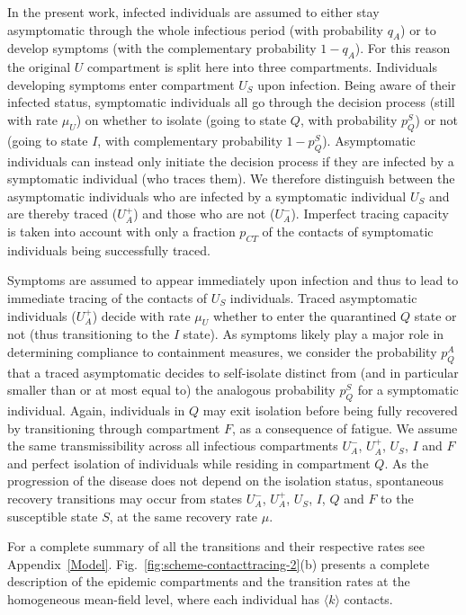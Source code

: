 \documentclass[aps,twocolumn,superscriptaddress,nofootinbib,pre,floatfix]{revtex4-1}
\begin{document}
In the present work, infected individuals are assumed to either stay
asymptomatic through the whole infectious period (with probability
$q_A$) or to develop symptoms (with the complementary probability $1-q_A$).
For this reason the original $U$ compartment is split here into three
compartments.
Individuals developing symptoms enter compartment $U_S$ upon infection.
Being aware of their infected status, symptomatic individuals all go
through the decision process (still with rate $\mu_U$)
on whether to isolate (going to state $Q$, with probability $p_Q^S$)
or not (going to state $I$, with complementary probability $1-p_Q^S$).
Asymptomatic individuals can instead only initiate the decision
process if they are infected by a symptomatic individual (who traces them).
We therefore distinguish
between the asymptomatic individuals who are infected by a
symptomatic individual $U_S$ and are thereby traced ($U_A^+$)
and those who are not ($U_A^-$).
Imperfect tracing capacity is taken into account with
only a fraction $p_{CT}$ of the contacts of symptomatic individuals being successfully traced.


Symptoms are assumed to appear immediately upon infection and thus to
lead to immediate tracing of the contacts of $U_S$ individuals.
Traced asymptomatic individuals ($U_A^+$) decide with rate $\mu_U$
whether to enter the quarantined $Q$ state or not
(thus transitioning to the $I$ state).
As symptoms likely play a major role in determining compliance to
containment measures, we consider the probability
$p_Q^A$ that a traced asymptomatic decides to self-isolate distinct
from (and in particular smaller than or at most equal to) the analogous
probability $p_Q^S$ for a symptomatic individual.
Again, individuals in $Q$ may exit isolation before being fully
recovered by transitioning through compartment $F$, as a consequence
of fatigue.
We assume the same transmissibility across all infectious compartments
$U_A^-$, $U_A^+$, $U_S$, $I$ and $F$ and perfect isolation of
individuals while residing in compartment $Q$.
As the progression of the disease does not depend on the isolation
status, spontaneous recovery transitions may occur from states $U_A^-$,
$U_A^+$, $U_S$, $I$, $Q$ and $F$ to the susceptible state $S$, at the same
recovery rate $\mu$.

For a complete summary of all the transitions and their respective rates
see Appendix~\ref{Model}.
Fig.~\ref{fig:scheme-contacttracing-2}(b) presents a complete
description of the epidemic compartments and the transition
rates at the homogeneous mean-field level, where each individual has
$\langle k \rangle$ contacts.
\end{document}
